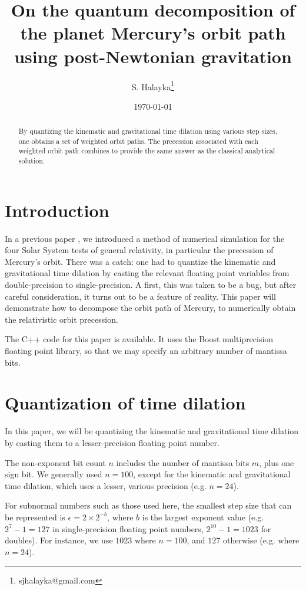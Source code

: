 \documentclass[12pt]{article}
\title{On the quantum decomposition of the planet Mercury's orbit path using post-Newtonian gravitation}
\author{S. Halayka\footnote{sjhalayka@gmail.com}}
\date{\today\;\currenttime}
\begin{document}
 
\maketitle

\begin{abstract}
By quantizing the kinematic and gravitational time dilation using various step sizes, one obtains a set of weighted orbit paths.
The precession associated with each weighted orbit path combines to provide the same answer as the classical analytical solution.
\end{abstract}





\section{Introduction}

In a previous paper \cite{halayka}, we introduced a method of numerical simulation for the four Solar System tests of general relativity, in particular the precession of Mercury's orbit.
There was a catch: one had to quantize the kinematic and gravitational time dilation by casting the relevant floating point variables from double-precision to single-precision.
A first, this was taken to be a bug, but after careful consideration, it turns out to be a feature of reality.
This paper will demonstrate how to decompose the orbit path of Mercury, to numerically obtain the relativistic orbit precession.

The C++ code for this paper is available.
It uses the Boost multiprecision floating point library, so that we may specify an arbitrary number of mantissa bits.


\section{Quantization of time dilation}

In this paper, we will be quantizing the kinematic and gravitational time dilation by casting them to a lesser-precision floating point number.

The non-exponent bit count $n$ includes the number of mantissa bits $m$, plus one sign bit.
We generally used $n = 100$, except for the kinematic and gravitational time dilation, which uses a lesser, various precision (e.g. $n = 24$).

For subnormal numbers such as those used here, the smallest step size that can be represented is $\epsilon = 2 \times 2^{-b}$, where $b$ is the largest exponent value (e.g. $2^7 - 1 = 127$ in single-precision floating point numbers, $2^{10} - 1 = 1023$ for doubles).
For instance, we use $1023$ where $n = 100$, and $127$ otherwise (e.g. where $n = 24$).
\end{document}
